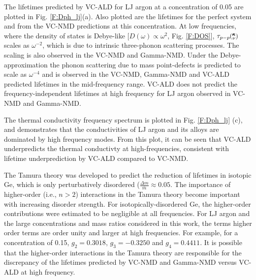 \documentclass[aps,prb,onecolumn,preprint,superscriptaddress,amsmath,amssymb,floatfix]{revtex4}
\newcommand{\kv}{\mspace{-4.0mu}\left(\mspace{-8.0mu}
\begin{smallmatrix}&\pmb{\kappa} \\&\nu\end{smallmatrix}
\mspace{-3.0mu}\right)}
\begin{document}
The lifetimes predicted by VC-ALD for LJ argon at a concentration 
of 0.05 are plotted in Fig. \ref{F:Dph_lj}(a).   
Also plotted are the lifetimes for the perfect system and from the 
VC-NMD predictions at this concentration. At low frequencies, 
where the density of states is Debye-like 
[$D(\omega) \propto \omega^{2}$, Fig. \ref{F:DOS}], 
$\tau_{p-p}\kv$ scales as $\omega^{-2}$, which is due 
to intrinsic three-phonon scattering processes.
\cite{maradudin_scattering_1962}  
The scaling is also observed  
in the VC-NMD and Gamma-NMD.  
Under the Debye-approximation  
the phonon scattering due to mass point-defects 
is predicted to scale as $\omega^{-4}$ and is observed 
in the VC-NMD, Gamma-NMD and VC-ALD predicted lifetimes in the 
mid-frequency range. 
VC-ALD does not predict the frequency-independent lifetimes 
at high frequency for LJ argon observed in VC-NMD and Gamma-NMD. 

The thermal conductivity frequency spectrum is plotted in 
Fig. \ref{F:Dph_lj} (c), and demonstrates that the conductivities of 
LJ argon and its alloys are dominated by high frequency modes. 
From this plot, it can be seen that VC-ALD underpredicts 
the thermal conductivty at high-frequencies, consistent with 
lifetime underprediction by VC-ALD compared to VC-NMD.


The Tamura theory was developed to predict the reduction of lifetimes 
in isotopic Ge, which is only perturbatively disordered 
($\frac{\Delta m}{\bar m} \approx 0.05$.  
The importance of higher-order (i.e., $n > 2$) interactions in the 
Tamura theory become important with increasing disorder strength.
\cite{tamura_isotope_1983} 
For isotopically-disordered Ge, the higher-order contributions 
were estimated to be negligible at all 
frequencies.\cite{tamura_isotope_1983} 
For LJ argon and the large concentrations and mass ratios considered 
in this work, the terms higher order terms are order unity and 
larger at high frequencies. For example, for a concentration of 0.15, 
$g_2 = 0.3018$, $g_3 = -0.3250$ and $g_4 = 0.4411$. 
It is possible that the  
higher-order interactions in the Tamura theory 
are responsible for the 
discrepancy of the lifetimes predicted by VC-NMD and Gamma-NMD 
versus VC-ALD at high frequency.
\end{document}
